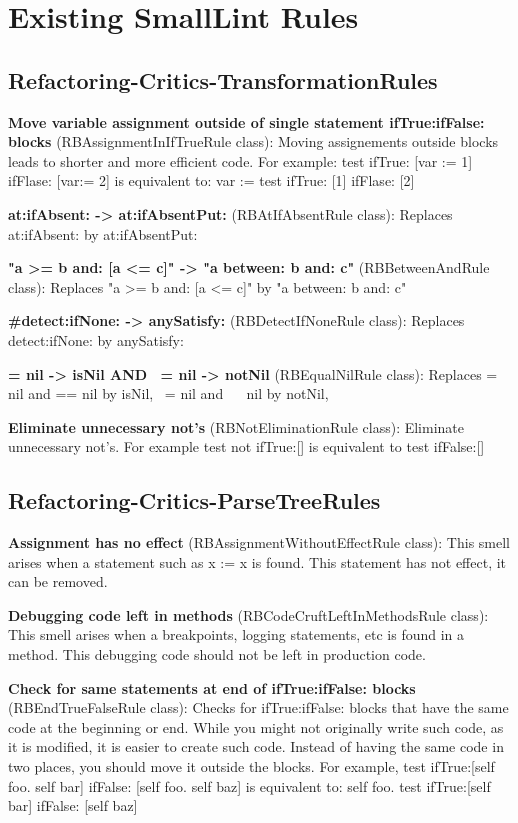 \section{Existing SmallLint Rules}
\subsection{Refactoring-Critics-TransformationRules}
\textbf{Move variable assignment outside of single statement ifTrue:ifFalse: blocks} (RBAssignmentInIfTrueRule class): Moving assignements outside blocks leads to shorter and more efficient code.
For example:
test 
	ifTrue: [var := 1]
	ifFlase: [var:= 2]
is equivalent to:
var :=  test 
	ifTrue: [1]
	ifFlase: [2]

\textbf{at:ifAbsent: -> at:ifAbsentPut:} (RBAtIfAbsentRule class):  Replaces at:ifAbsent: by at:ifAbsentPut:

\textbf{"a >= b and: [a <= c]" -> "a between: b and: c"} (RBBetweenAndRule class):  Replaces "a >= b and: [a <= c]" by "a between: b and: c"

\textbf{#detect:ifNone: -> anySatisfy:} (RBDetectIfNoneRule class): Replaces detect:ifNone: by anySatisfy:

\textbf{= nil -> isNil AND ~= nil -> notNil} (RBEqualNilRule class): Replaces = nil and == nil by isNil, ~= nil and ~~ nil by notNil, 

\textbf{Eliminate unnecessary not's} (RBNotEliminationRule class): Eliminate unnecessary not's.
For example test not ifTrue:[] is equivalent to test ifFalse:[]

\subsection{Refactoring-Critics-ParseTreeRules}
\textbf{Assignment has no effect} (RBAssignmentWithoutEffectRule class): This smell arises when a statement such as x := x is found. This statement has not effect, it can be removed.

\textbf{Debugging code left in methods} (RBCodeCruftLeftInMethodsRule class): This smell arises when a breakpoints, logging statements, etc is found in a method. This debugging code should not be left in production code.

\textbf{Check for same statements at end of ifTrue:ifFalse: blocks} (RBEndTrueFalseRule class): Checks for ifTrue:ifFalse: blocks that have the same code at the beginning or end. While you might not originally write such code, as it is modified, it is easier to create such code. Instead of having the same code in two places, you should move it outside the blocks.
For example, 
test 
	ifTrue:[self foo. self bar] 
	ifFalse: [self foo. self baz]
 is equivalent to: 
self foo.  
test 
	ifTrue:[self bar] 
	ifFalse: [self baz]

